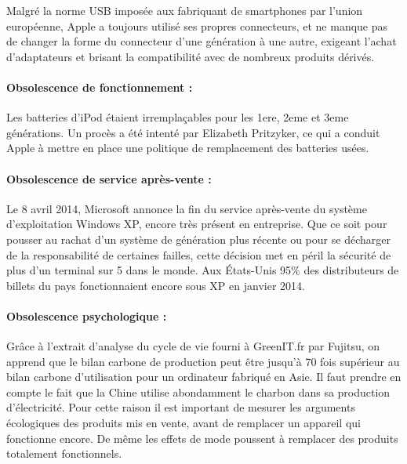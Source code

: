 Malgré la norme USB imposée aux fabriquant de smartphones par l’union européenne, Apple a toujours utilisé ses propres connecteurs, et ne manque pas de changer la forme du connecteur d’une génération à une autre, exigeant l'achat d'adaptateurs et brisant la compatibilité avec de nombreux produits dérivés.

\paragraph*{Obsolescence de fonctionnement :}

Les batteries d’iPod étaient irremplaçables pour les 1ere, 2eme et 3eme générations. Un procès a été intenté par Elizabeth Pritzyker, ce qui a conduit Apple à mettre en place une politique de remplacement des batteries usées.

\paragraph*{Obsolescence de service après-vente :}

Le 8 avril 2014, Microsoft annonce la fin du service après-vente du système d’exploitation Windows XP, encore très présent en entreprise. Que ce soit pour pousser au rachat d’un système de génération plus récente ou pour se décharger de la responsabilité de certaines failles, cette décision met en péril la sécurité de plus d'un terminal sur 5 dans le monde. Aux États-Unis 95\% des distributeurs de billets du pays fonctionnaient encore sous XP en janvier 2014.

\paragraph*{Obsolescence psychologique :}

Grâce à l’extrait d’analyse du cycle de vie fourni à GreenIT.fr par Fujitsu, on apprend que le bilan carbone de production peut être jusqu’à 70 fois supérieur au bilan carbone d’utilisation pour un ordinateur fabriqué en Asie. Il faut prendre en compte le fait que la Chine utilise abondamment le charbon dans sa production d'électricité. Pour cette raison il est important de mesurer les arguments écologiques des produits mis en vente, avant de remplacer un appareil qui fonctionne encore. De même les effets de mode poussent à remplacer des produits totalement fonctionnels.

\newpage